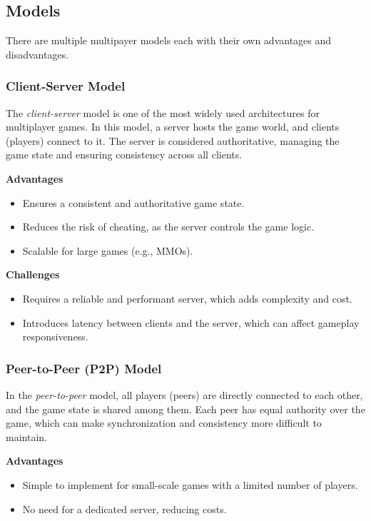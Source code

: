 \documentclass{article} %
\begin{document}
\subsection{Models}
There are multiple multipayer models each with their own advantages and disadvantages. \cite{Kroupp_2024}

\subsubsection{Client-Server Model}
The \textit{client-server} model is one of the most widely used architectures for multiplayer games. In this model, a server hosts the game world, and clients (players) connect to it. The server is considered authoritative, managing the game state and ensuring consistency across all clients.

\textbf{Advantages}
\begin{itemize}
    \item Ensures a consistent and authoritative game state.
    \item Reduces the risk of cheating, as the server controls the game logic.
    \item Scalable for large games (e.g., MMOs).
\end{itemize}

\textbf{Challenges}
\begin{itemize}
    \item Requires a reliable and performant server, which adds complexity and cost.
    \item Introduces latency between clients and the server, which can affect gameplay responsiveness.
\end{itemize}

\subsubsection{Peer-to-Peer (P2P) Model}
In the \textit{peer-to-peer} model, all players (peers) are directly connected to each other, and the game state is shared among them. Each peer has equal authority over the game, which can make synchronization and consistency more difficult to maintain.

\textbf{Advantages}
\begin{itemize}
    \item Simple to implement for small-scale games with a limited number of players.
    \item No need for a dedicated server, reducing costs.
\end{itemize}
\end{document}
